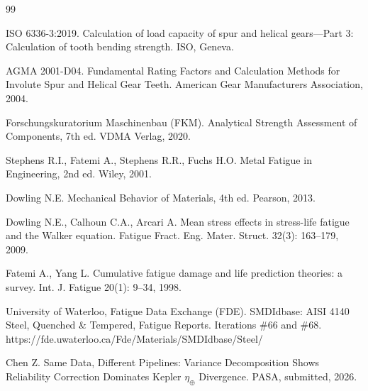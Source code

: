 \documentclass[12pt,a4paper]{article}
\begin{document}
\begin{thebibliography}{99}

ISO 6336-3:2019. Calculation of load capacity of spur and helical
gears---Part 3: Calculation of tooth bending strength. ISO, Geneva.

AGMA 2001-D04. Fundamental Rating Factors and Calculation Methods for
Involute Spur and Helical Gear Teeth. American Gear Manufacturers
Association, 2004.

Forschungskuratorium Maschinenbau (FKM). Analytical Strength Assessment
of Components, 7th ed. VDMA Verlag, 2020.

Stephens R.I., Fatemi A., Stephens R.R., Fuchs H.O. Metal Fatigue in
Engineering, 2nd ed. Wiley, 2001.

Dowling N.E. Mechanical Behavior of Materials, 4th ed. Pearson, 2013.

Dowling N.E., Calhoun C.A., Arcari A. Mean stress effects in
stress-life fatigue and the Walker equation. Fatigue Fract. Eng. Mater.
Struct. 32(3): 163--179, 2009.

Fatemi A., Yang L. Cumulative fatigue damage and life prediction
theories: a survey. Int. J. Fatigue 20(1): 9--34, 1998.

University of Waterloo, Fatigue Data Exchange (FDE). SMDIdbase: AISI 4140
Steel, Quenched \& Tempered, Fatigue Reports. Iterations \#66 and \#68.
https://fde.uwaterloo.ca/Fde/Materials/SMDIdbase/Steel/

Chen Z. Same Data, Different Pipelines: Variance Decomposition Shows
Reliability Correction Dominates Kepler $\eta_\oplus$ Divergence.
PASA, submitted, 2026.

\end{thebibliography}
\end{document}
